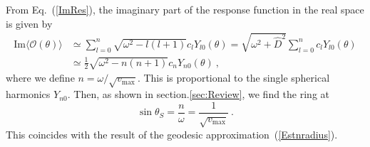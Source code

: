 \documentclass[a4paper,11pt]{article}
\begin{document}
    From Eq.~(\ref{ImRes}), the imaginary part of the response function in the real space is given by
    \begin{equation}
    \begin{split}
    \textrm{Im}\langle\mathcal{O}(\theta)\rangle &\simeq \sum_{l=0}^n \sqrt{\omega^2-l(l+1)} c_l Y_{l0}(\theta) = \sqrt{\omega^2+\hat{D}^2} \sum_{l=0}^n c_l Y_{l0}(\theta)\\
    &\simeq \frac{1}{2}\sqrt{\omega^2-n(n+1)} c_n Y_{n0}(\theta)\ ,
    \end{split} 
    \end{equation}
    where we define $n=\omega/\sqrt{v_\textrm{max}}$. This is proportional to the single spherical harmonics $Y_{n0}$. 
    Then, as shown in section.\ref{sec:Review}, we find the ring at
    \begin{equation}
     \sin\theta_S = \frac{n}{\omega} = \frac{1}{\sqrt{v_\textrm{max}}}\ .
\label{WKBthetaS}
    \end{equation}
    This coincides with the result of the geodesic approximation~(\ref{Estnradius}).






 
\end{document}
